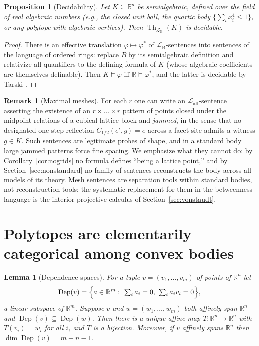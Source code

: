 \documentclass[11pt]{amsart}
\newtheorem{proposition}[theorem]{Proposition}
\newtheorem{lemma}[theorem]{Lemma}
\theoremstyle{definition}
\newtheorem{remark}[theorem]{Remark}
\newcommand{\R}{\mathbb{R}}
\newcommand{\Laff}{\mathcal{L}_{\mathrm{aff}}}
\newcommand{\LB}{\mathcal{L}_{\mathrm{B}}}
\newcommand{\Dep}{\operatorname{Dep}}
\newcommand{\Th}{\operatorname{Th}}
\begin{document}
\begin{proposition}[Decidability]\label{prop:decidable}
Let $K\subseteq\R^n$ be semialgebraic, defined over the field of real
algebraic numbers (e.g., the closed unit ball, the quartic body
$\{\sum_i x_i^4\le1\}$, or any polytope with algebraic vertices). Then
$\Th_{\LB}(K)$ is decidable.
\end{proposition}

\begin{proof}
There is an effective translation $\varphi\mapsto\varphi^*$ of
$\LB$-sentences into sentences of the language of ordered rings: replace $B$
by its semialgebraic definition and relativize all quantifiers to the
defining formula of $K$ (whose algebraic coefficients are themselves
definable). Then $K\models\varphi$ iff $\R\models\varphi^*$, and the latter
is decidable by Tarski \cite{Tarski51}.
\end{proof}

\begin{remark}[Maximal meshes]\label{rem:meshes}
For each $r$ one can write an $\Laff$-sentence asserting the existence of an
$r\times\dots\times r$ pattern of points closed under the midpoint relations
of a cubical lattice block and \emph{jammed}, in the sense that no designated
one-step reflection $C_{1/2}(e',g)=e$ across a facet site admits a witness
$g\in K$. Such sentences are legitimate probes of shape, and in a standard
body large jammed patterns force fine spacing. We emphasize what they cannot
do: by Corollary~\ref{cor:nogrids} no formula defines ``being a lattice
point,'' and by Section~\ref{sec:nonstandard} no family of sentences
reconstructs the body across all models of its theory. Mesh sentences are
separation tools within standard bodies, not reconstruction tools; the
systematic replacement for them in the betweenness language is the interior
projective calculus of Section~\ref{sec:vonstaudt}.
\end{remark}

\section{Polytopes are elementarily categorical among convex bodies}
\label{sec:polytopes}

\begin{lemma}[Dependence spaces]\label{lem:dependence}
For a tuple $v=(v_1,\dots,v_m)$ of points of $\R^n$ let
\[
\Dep(v)=\Bigl\{a\in\R^m:\ \textstyle\sum_i a_i=0,\ \sum_i a_i v_i=0\Bigr\},
\]
a linear subspace of $\R^m$. Suppose $v$ and $w=(w_1,\dots,w_m)$ both
affinely span $\R^n$ and $\Dep(v)\subseteq\Dep(w)$. Then there is a unique
affine map $T\colon\R^n\to\R^n$ with $T(v_i)=w_i$ for all $i$, and $T$ is a
bijection. Moreover, if $v$ affinely spans $\R^n$ then
$\dim\Dep(v)=m-n-1$.
\end{lemma}
\end{document}
